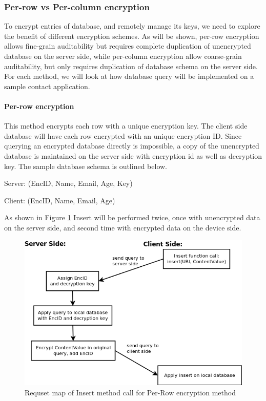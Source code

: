 \subsubsection{Per-row vs Per-column encryption}\label{LitRevEnc}

To encrypt entries of database, and remotely manage its keys, we need to explore the benefit of different encryption schemes. As will be shown, per-row encryption allows fine-grain auditability but requires complete duplication of unencrypted database on the server side, while per-column encryption allow coarse-grain auditability, but only requires duplication of database schema on the server side. For each method, we will look at how database query will be implemented on a sample contact application.

\paragraph{Per-row encryption}\label{LitRevEncRow}

This method encrypts each row with a unique encryption key. The client side database will have each row encrypted with an unique encryption ID. Since querying an encrypted database directly is impossible, a copy of the unencrypted database is maintained on the server side with encryption id as well as decryption key. The sample database schema is outlined below.

Server: (EncID, Name, Email, Age, Key)

Client: (EncID, Name, Email, Age)

As shown in Figure \ref{FigRowInsert} Insert will be performed twice, once with unencrypted data on the server side, and second time with encrypted data on the device side.

\begin{figure}[h]
  \centering
  \includegraphics[scale=0.45]{./Figs/row_insert.png}
  \caption
  {Requset map of Insert method call for Per-Row encryption method}
  \label{FigRowInsert}
\end{figure}

